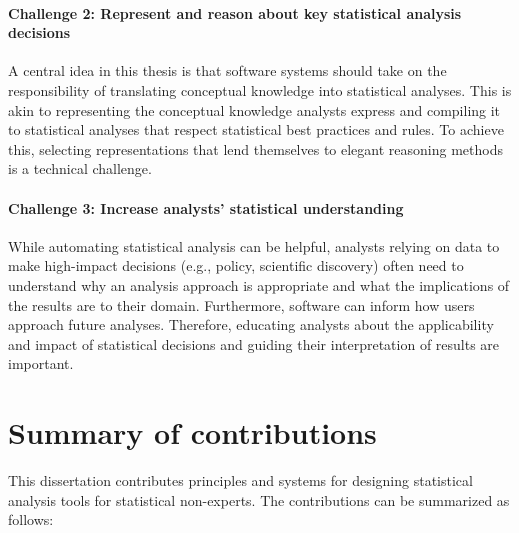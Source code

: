 

\def\thesisChallengeRep{\textbf{Thesis Challenge 2: Representation and automated reasoning}}
\paragraph{Challenge 2: Represent and reason about key statistical analysis decisions} %
A central idea in this thesis is that software systems should take on the
responsibility of translating conceptual knowledge into statistical analyses.
This is akin to representing the conceptual knowledge analysts express and
compiling it to statistical analyses that respect statistical best practices and
rules. To achieve this, selecting representations that lend themselves to
elegant reasoning methods is a technical challenge.

\def\thesisChallengeUnderstanding{\textbf{Thesis Challenge 3: Statistical understanding}}
\paragraph{Challenge 3: Increase analysts' statistical understanding} %
While automating statistical analysis can be helpful, analysts relying on data
to make high-impact decisions (e.g., policy, scientific discovery) often need to
understand why an analysis approach is appropriate and what the implications of
the results are to their domain. Furthermore, software can inform how users
approach future analyses. Therefore, educating analysts about the applicability
and impact of statistical decisions and guiding their interpretation of results
are important.

\section{Summary of contributions}
This dissertation contributes principles and systems for designing statistical analysis
tools for statistical non-experts. The contributions can be summarized as follows: 

